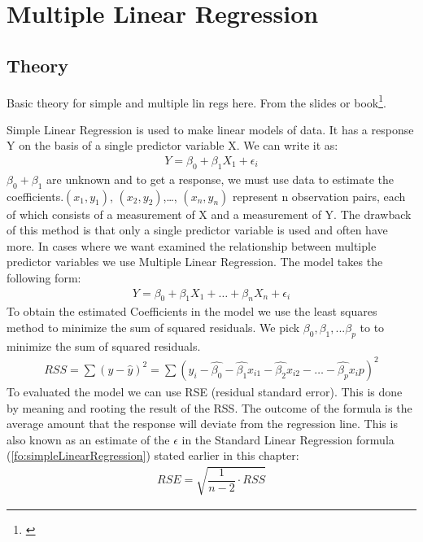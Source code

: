 \section{Multiple Linear Regression}\label{sc:multipleLinearRegression}

\subsection{Theory}

Basic theory for simple and multiple lin regs here. From the slides or book\footnote{\cite{James2013}}.

Simple Linear Regression is used to make linear models of data. It has a response Y on the basis of a single predictor variable X. We can write it as:
\begin{align}\label{fo:simpleLinearRegression}
Y = \beta_0 + \beta_1 X_1 + \epsilon_i
\end{align}
$ \beta_0 + \beta_1 $ are unknown and to get a response, we must use data to estimate the coefficients.$(x_1, y_1)$, $(x_2, y_2)$,\ldots, $(x_n, y_n)$ represent n observation pairs, each of which consists of a measurement of X and a measurement of Y. The drawback of this method is that only a single predictor variable is used and often have more.
 In cases where we want examined the relationship between multiple predictor variables we use Multiple Linear Regression. The model takes the following form:
\begin{align}\label{fo:multipleLinearRegression}
Y = \beta_0 + \beta_1 X_1 + \ldots + \beta_n X_n + \epsilon_i
\end{align}
To obtain the estimated Coefficients in the model we use the least squares method to minimize the sum of squared residuals. We pick $\beta_0, \beta_1, ... \beta_p$ to to minimize the sum of squared residuals.
\begin{align}\label{fo:rss}
RSS = \sum (y - \hat{y})^2 = \sum( y_i - \hat{\beta_0} - \hat{\beta_1}x_{i1} - \hat{\beta_2}x_{i2} - \ldots - \hat{\beta_p}x_\textit{i}p )^2
\end{align}
To evaluated the model we can use RSE (residual standard error). This is done by meaning and rooting the result of the RSS. The outcome of the formula is the average amount that the response will deviate from the regression line. This is also known as an estimate of the $\epsilon$ in the Standard Linear Regression formula (\ref{fo:simpleLinearRegression}) stated earlier in this chapter:
\begin{align}\label{fo:rse}
RSE = \sqrt{\dfrac{1}{n-2}\cdot RSS}
\end{align}


